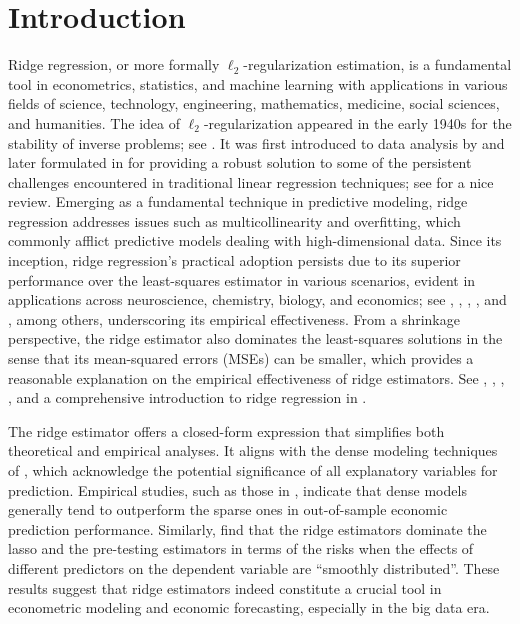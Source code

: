 		\section{Introduction}
Ridge regression, or more formally $\ell_2$-regularization estimation, is a fundamental tool in econometrics, statistics, and machine learning with applications in various fields of science, technology, engineering, mathematics, medicine, social sciences, and humanities. The idea of $\ell_2$-regularization appeared in the early  1940s  for the stability of inverse problems; see \cite{tikhonov1943stability}.
It was first introduced to data analysis by \cite{hoerl1959optimum}  and later formulated in \cite{hoerl1970aridge,hoerl1970bridge} for providing a robust solution to some of the persistent challenges encountered in traditional linear regression techniques; see \cite{hoerl1985ridge} for a nice review. Emerging as a fundamental technique in predictive modeling, ridge regression addresses issues such as multicollinearity and overfitting, which commonly afflict predictive models dealing with high-dimensional data. Since its inception, ridge regression's practical adoption persists due to its superior performance over the least-squares estimator in various scenarios, evident in applications across neuroscience, chemistry, biology, and economics; see \cite{leonard2023large}, \cite{zahrt2019prediction}, \cite{otwinowski2014inferring}, \cite{giannone2021economic}, and \cite{abadie2019choosing}, among others, underscoring its empirical effectiveness. From a shrinkage perspective, the ridge estimator also dominates the least-squares solutions in the sense that its mean-squared errors (MSEs) can be smaller, which provides a reasonable explanation  on the empirical effectiveness of ridge estimators.  See \cite{theobald1974generalizations}, \cite{athey2019machine}, \cite{hastie2020ridge}, \cite{hansen2022econometrics}, and a comprehensive introduction to ridge regression in  \cite{van2023lecture}.




The ridge estimator offers a closed-form expression that simplifies both theoretical and empirical analyses. It aligns with the dense modeling techniques of \cite{giannone2021economic}, which acknowledge the potential significance of all explanatory variables for prediction. Empirical studies, such as those in \cite{giannone2021economic}, indicate that dense models generally tend to outperform the sparse ones in out-of-sample economic prediction performance. Similarly, \cite{abadie2019choosing} find that the ridge estimators dominate the lasso and the pre-testing estimators in terms of the risks when the effects of different predictors on the dependent variable are ``smoothly distributed”. 
These results suggest that ridge estimators indeed constitute a crucial tool in econometric modeling and economic forecasting, especially in the big data era.


